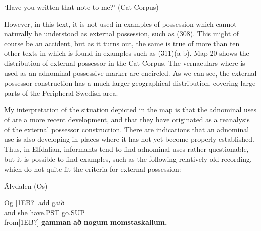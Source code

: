 \glt ‘Have you written that note to me?’ (Cat Corpus)

\z

However, in this text, it is not used in examples of possession which cannot naturally be understood as external possession, such as (308). This might of course be an accident, but as it turns out, the same is true of more than ten other texts in which  is found in examples such as (311)(a-b). Map 20 shows the distribution of external possessor  in the Cat Corpus. The vernaculars where  is used as an adnominal possessive marker are encircled. As we can see, the external possessor construction has a much larger geographical distribution, covering large parts of the Peripheral Swedish area. 


My interpretation of the situation depicted in the map is that the adnominal uses of are a more recent development, and that they have originated as a reanalysis of the external possessor construction. There are indications that an adnominal use is also developing in places where it has not yet become properly established. Thus, in Elfdalian, informants tend to find adnominal uses rather questionable, but it is possible to find examples, such as the following relatively old recording, which do not quite fit the criteria for external possession: 


\item 

Älvdalen (Os)



 \ea\label{}
\gll Og  [1EB?]  add  gaið\\


and  she  have.PST  go.SUP\\

 \ea\label{}
\gll from[1EB?]  \textbf{gamman} \textbf{að} \textbf{nogum} \textbf{momstaskallum.}\\


